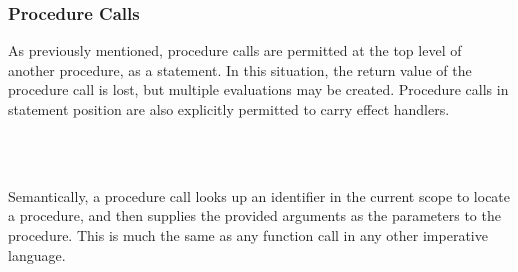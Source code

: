 \subsubsection{Procedure Calls}

As previously mentioned, procedure calls are permitted at the top level of
another procedure, as a statement. In this situation, the return value of
the procedure call is lost, but multiple evaluations may be created. Procedure
calls in statement position are also explicitly permitted to carry effect handlers.

\begin{bnf*}
     \\
     \\
\end{bnf*}

Semantically, a procedure call looks up an identifier in the current scope to
locate a procedure, and then supplies the provided arguments as the parameters
to the procedure. This is much the same as any function call in any other
imperative language.

\begin{prooftree}
\end{prooftree}
